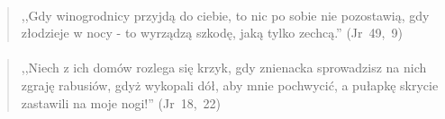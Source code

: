 \documentclass[10pt,a4paper,oneside]{article}
\begin{document}
\paragraph{}
\begin{quote}
,,Gdy winogrodnicy przyjdą do ciebie, to nic po sobie nie pozostawią, gdy złodzieje w nocy - to wyrządzą szkodę, jaką tylko zechcą.'' \mbox{(Jr 49, 9)}
\end{quote}
\paragraph{}
\begin{quote}
,,Niech z ich domów rozlega się krzyk, gdy znienacka sprowadzisz na nich zgraję rabusiów, gdyż wykopali dół, aby mnie pochwycić, a pułapkę skrycie zastawili na moje nogi!'' \mbox{(Jr 18, 22)}
\end{quote}
\end{document}
